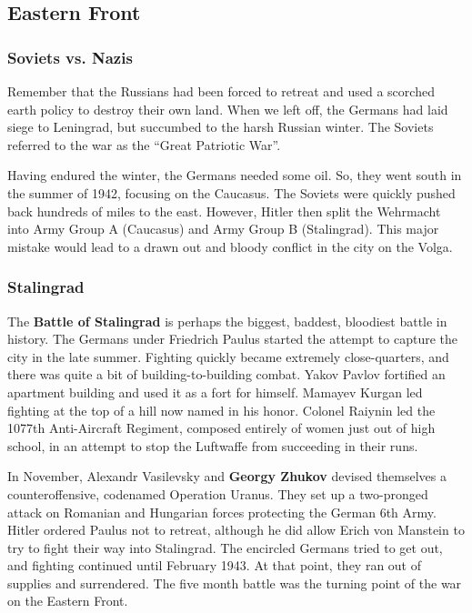 \subsection*{Eastern Front}

\subsubsection*{Soviets vs. Nazis}

Remember that the Russians had been forced to retreat and used a scorched earth policy to destroy their own land.
When we left off, the Germans had laid siege to Leningrad, but succumbed to the harsh Russian winter.
The Soviets referred to the war as the ``Great Patriotic War''.

Having endured the winter, the Germans needed some oil.
So, they went south in the summer of 1942, focusing on the Caucasus.
The Soviets were quickly pushed back hundreds of miles to the east.
However, Hitler then split the Wehrmacht into Army Group A (Caucasus) and Army Group B (Stalingrad).
This major mistake would lead to a drawn out and bloody conflict in the city on the Volga.

\subsubsection*{Stalingrad}

The \textbf{Battle of Stalingrad} is perhaps the biggest, baddest, bloodiest battle in history.
The Germans under Friedrich Paulus started the attempt to capture the city in the late summer.
Fighting quickly became extremely close-quarters, and there was quite a bit of building-to-building combat.
Yakov Pavlov fortified an apartment building and used it as a fort for himself.
Mamayev Kurgan led fighting at the top of a hill now named in his honor.
Colonel Raiynin led the 1077th Anti-Aircraft Regiment, composed entirely of women just out of high school,
in an attempt to stop the Luftwaffe from succeeding in their runs.

In November, Alexandr Vasilevsky and \textbf{Georgy Zhukov} devised themselves a counteroffensive,
codenamed Operation Uranus.
They set up a two-pronged attack on Romanian and Hungarian forces protecting the German 6th Army.
Hitler ordered Paulus not to retreat,
although he did allow Erich von Manstein to try to fight their way into Stalingrad.
The encircled Germans tried to get out, and fighting continued until February 1943.
At that point, they ran out of supplies and surrendered.
The five month battle was the turning point of the war on the Eastern Front.


